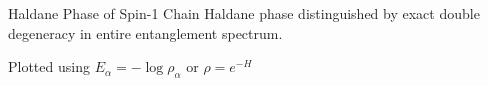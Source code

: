 \begin{frame}{Haldane Phase of Spin-1 Chain}
\vskip-1.5cm
Haldane phase distinguished by exact double degeneracy in entire  entanglement spectrum.

Plotted using $E_{\alpha} = -\log{\rho_{\alpha}}$ or $\rho = e^{-H}$
\end{frame}
